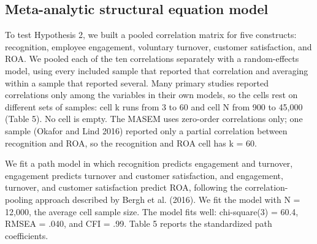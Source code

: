 \documentclass[11pt]{article}
\begin{document}
\subsection{Meta-analytic structural equation model}

To test Hypothesis 2, we built a pooled correlation matrix for five constructs: recognition, employee engagement, voluntary turnover, customer satisfaction, and ROA. We pooled each of the ten correlations separately with a random-effects model, using every included sample that reported that correlation and averaging within a sample that reported several. Many primary studies reported correlations only among the variables in their own models, so the cells rest on different sets of samples: cell k runs from 3 to 60 and cell N from 900 to 45,000 (Table 5). No cell is empty. The MASEM uses zero-order correlations only; one sample (Okafor and Lind 2016) reported only a partial correlation between recognition and ROA, so the recognition and ROA cell has k = 60.

We fit a path model in which recognition predicts engagement and turnover, engagement predicts turnover and customer satisfaction, and engagement, turnover, and customer satisfaction predict ROA, following the correlation-pooling approach described by Bergh et al. (2016). We fit the model with N = 12,000, the average cell sample size. The model fits well: chi-square(3) = 60.4, RMSEA = .040, and CFI = .99. Table 5 reports the standardized path coefficients.
\end{document}
